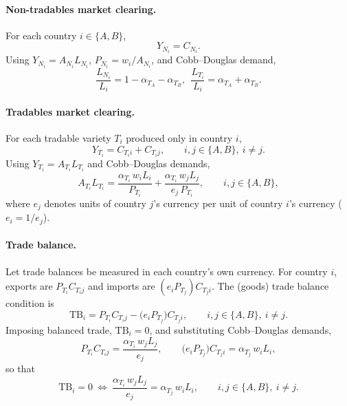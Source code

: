 \documentclass[11pt]{article}
\begin{document}
\paragraph{Non-tradables market clearing.}
For each country $i\in\{A,B\}$,
\begin{equation}
Y_{N_i}=C_{N_i}.
\end{equation}
Using $Y_{N_i}=A_{N_i}L_{N_i}$, $P_{N_i}=w_i/A_{N_i}$, and Cobb--Douglas demand,
\begin{equation}
\frac{L_{N_i}}{L_i}=1-\alpha_{T_A}-\alpha_{T_B},\ \ 
\frac{L_{T_i}}{L_i}=\alpha_{T_A}+\alpha_{T_B}.
\end{equation}

\paragraph{Tradables market clearing.}
For each tradable variety $T_i$ produced only in country $i$,
\begin{equation}
Y_{T_i}=C_{T_i i}+C_{T_i j}, \qquad i,j\in\{A,B\},\ i\neq j.
\end{equation}
Using $Y_{T_i}=A_{T_i}L_{T_i}$ and Cobb--Douglas demands,
\begin{equation}
A_{T_i}L_{T_i}
=\frac{\alpha_{T_i}\, w_i L_i}{P_{T_i}}
+\frac{\alpha_{T_i}\, w_j L_j}{e_j\, P_{T_i}},
\qquad i,j\in\{A,B\},
\label{eq:T_world_clearing}
\end{equation}
where $e_j$ denotes units of country $j$’s currency per unit of country $i$’s currency ($e_i=1/e_j$).

\paragraph{Trade balance.}
Let trade balances be measured in each country’s own currency. For country $i$, exports are $P_{T_i} C_{T_i j}$ and imports are $(e_i P_{T_j}) C_{T_j i}$. The (goods) trade balance condition is
\begin{equation}
\mathrm{TB}_i 
= P_{T_i} C_{T_i j} - \big(e_i P_{T_j}\big) C_{T_j i},
\qquad i,j\in\{A,B\},\ i\neq j.
\end{equation}
Imposing balanced trade, $\mathrm{TB}_i=0$, and substituting Cobb--Douglas demands,
\begin{equation}
P_{T_i} C_{T_i j} = \frac{\alpha_{T_i}\, w_j L_j}{e_j},
\qquad
\big(e_i P_{T_j}\big) C_{T_j i} = \alpha_{T_j}\, w_i L_i,
\end{equation}
so that
\begin{equation}
\mathrm{TB}_i=0 
\ \Longleftrightarrow\ 
\frac{\alpha_{T_i}\, w_j L_j}{e_j}
= \alpha_{T_j}\, w_i L_i,
\qquad i,j\in\{A,B\},\ i\neq j.
\label{eq:TB_condition}
\end{equation}
\end{document}
